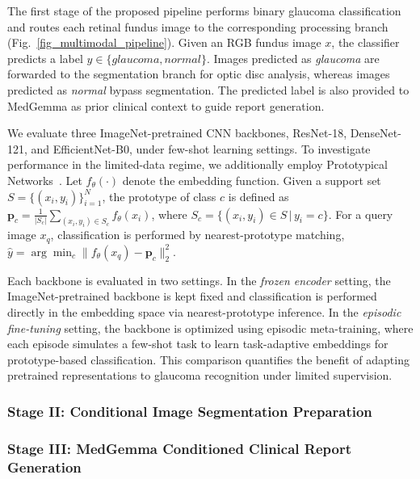 \documentclass[runningheads]{llncs}
\newcommand{\todo}[1]{\textcolor{red}{\textbf{[TODO: #1]}}}
\begin{document}
The first stage of the proposed pipeline performs binary glaucoma classification and routes each retinal fundus image to the corresponding processing branch (Fig.~\ref{fig_multimodal_pipeline}). Given an RGB fundus image $x$, the classifier predicts a label $y \in \{\textit{glaucoma}, \textit{normal}\}$. Images predicted as \textit{glaucoma} are forwarded to the segmentation branch for optic disc analysis, whereas images predicted as \textit{normal} bypass segmentation. The predicted label is also provided to MedGemma as prior clinical context to guide report generation.

We evaluate three ImageNet-pretrained CNN backbones, ResNet-18, DenseNet-121, and EfficientNet-B0, under few-shot learning settings. To investigate performance in the limited-data regime, we additionally employ Prototypical Networks~\cite{snell2017prototypical}. Let $f_{\theta}(\cdot)$ denote the embedding function. Given a support set $S=\{(x_i,y_i)\}_{i=1}^{N}$, the prototype of class $c$ is defined as $\mathbf{p}_c=\frac{1}{|S_c|}\sum_{(x_i,y_i)\in S_c}f_{\theta}(x_i)$, where $S_c=\{(x_i,y_i)\in S\,|\,y_i=c\}$. For a query image $x_q$, classification is performed by nearest-prototype matching, $\hat{y}=\arg\min_c \|f_{\theta}(x_q)-\mathbf{p}_c\|_2^2$.

Each backbone is evaluated in two settings. In the \emph{frozen encoder} setting, the ImageNet-pretrained backbone is kept fixed and classification is performed directly in the embedding space via nearest-prototype inference. In the \emph{episodic fine-tuning} setting, the backbone is optimized using episodic meta-training, where each episode simulates a few-shot task to learn task-adaptive embeddings for prototype-based classification. This comparison quantifies the benefit of adapting pretrained representations to glaucoma recognition under limited supervision.

\subsubsection{Stage II: Conditional Image Segmentation Preparation}
\label{sec:cond_img_seg_prep}


\subsubsection{Stage III: MedGemma Conditioned Clinical Report Generation}
\end{document}

